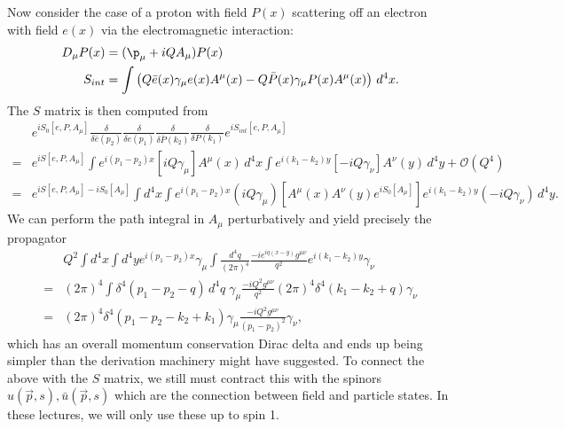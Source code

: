 \documentclass[relqm.tex]{subfiles}
\begin{document}
Now consider the case of a proton with field $P(x)$ scattering off an electron with field $e(x)$ via the electromagnetic interaction:
\begin{align}
    D_\mu P(x) &= (\p_\mu+iQA_\mu)P(x) \\
    S_{int} &= \int \left(Q\bar{e}(x)\gamma_\mu e(x)A^\mu(x) - Q\bar{P}(x)\gamma_\mu P(x)A^\mu(x)\right)\,d^4x.
\end{align}
The $S$ matrix is then computed from
\begin{equation}
    \begin{split}
        &e^{iS_0[e,P,A_\mu]}\frac{\delta}{\delta\bar{e}(p_2)}\frac{\delta}{\delta e(p_1)}\frac{\delta}{\delta\bar{P}(k_2)}\frac{\delta}{\delta P(k_1)}e^{iS_{int}[e,P,A_\mu]} \\
        =&e^{iS[e,P,A_\mu]}\int e^{i(p_1-p_2)x}[iQ\gamma_\mu]A^\mu(x)\,d^4x \int e^{i(k_1-k_2)y}[-iQ\gamma_\nu]A^\nu(y)\,d^4y + \mathcal{O}(Q^4) \\
        =&e^{iS[e,P,A_\mu]-iS_0[A_\mu]}\int d^4x \int e^{i(p_1-p_2)x}(iQ\gamma_\mu)\left[A^\mu(x)A^\nu(y)e^{iS_0[A_\mu]}\right]e^{i(k_1-k_2)y}(-iQ\gamma_\nu)\,d^4y.
    \end{split}
\end{equation}
We can perform the path integral in $A_\mu$ perturbatively and yield precisely the propagator
\begin{equation}
    \begin{split}
        &Q^2\int d^4x \int d^4y e^{i(p_1-p_2)x}\gamma_\mu \int \frac{d^4q}{(2\pi)^4}\frac{-ie^{iq(x-y)}g^{\mu\nu}}{q^2}e^{i(k_1-k_2)y}\gamma_\nu \\
        =&(2\pi)^4 \int \delta^4(p_1-p_2-q)\,d^4q\; \gamma_\mu\frac{-iQ^2g^{\mu\nu}}{q^2}(2\pi)^4\delta^4(k_1-k_2+q)\gamma_\nu \\
        =&(2\pi)^4\delta^4(p_1-p_2-k_2+k_1)\gamma_\mu\frac{-iQ^2g^{\mu\nu}}{(p_1-p_2)^2}\gamma_\nu,
    \end{split}
\end{equation}
which has an overall momentum conservation Dirac delta and ends up being simpler than the derivation machinery might have suggested. 
To connect the above with the $S$ matrix, we still must contract this with the spinors $u(\vec{p},s),\bar{u}(\vec{p},s)$ which are the connection between field and particle states.
In these lectures, we will only use these up to spin 1.
\end{document}
